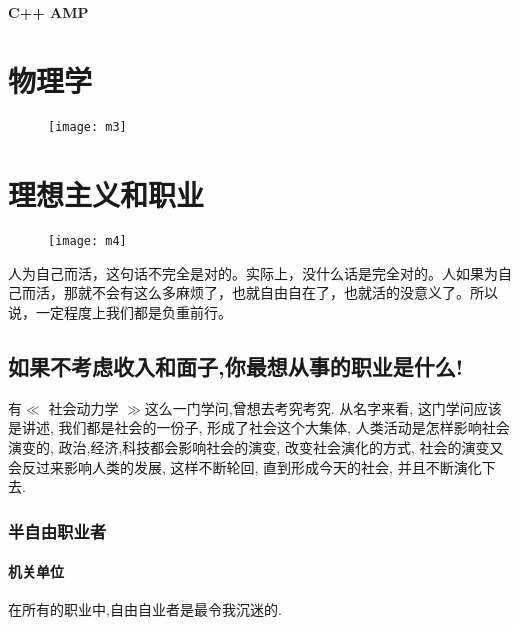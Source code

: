 \documentclass[utf8]{book}
\begin{document}
	\subsection{C++ AMP}
	

	
	
	\part{物理学}
		\begin{figure}[H]
		\centering
		\texttt{[image: m3]}
		\end{figure}

\part{理想主义和职业}

	\begin{figure}[H]
	\centering
	\texttt{[image: m4]}
	\end{figure}

	{\LARGE 人}为自己而活，这句话不完全是对的。实际上，没什么话是完全对的。人如果为自己而活，那就不会有这么多麻烦了，也就自由自在了，也就活的没意义了。所以说，一定程度上我们都是负重前行。
	
	
\chapter{如果不考虑收入和面子,你最想从事的职业是什么!}

	有$\ll$ 社会动力学 $\gg$这么一门学问,曾想去考究考究. 从名字来看, 这门学问应该是讲述, 我们都是社会的一份子, 形成了社会这个大集体, 人类活动是怎样影响社会演变的, 政治,经济,科技都会影响社会的演变, 改变社会演化的方式, 社会的演变又会反过来影响人类的发展, 这样不断轮回, 直到形成今天的社会, 并且不断演化下去.
	
\section{半自由职业者}

\subsection{机关单位}
\begin{onehalfspace}
	在所有的职业中,自由自业者是最令我沉迷的.
\end{onehalfspace}
\end{document}
